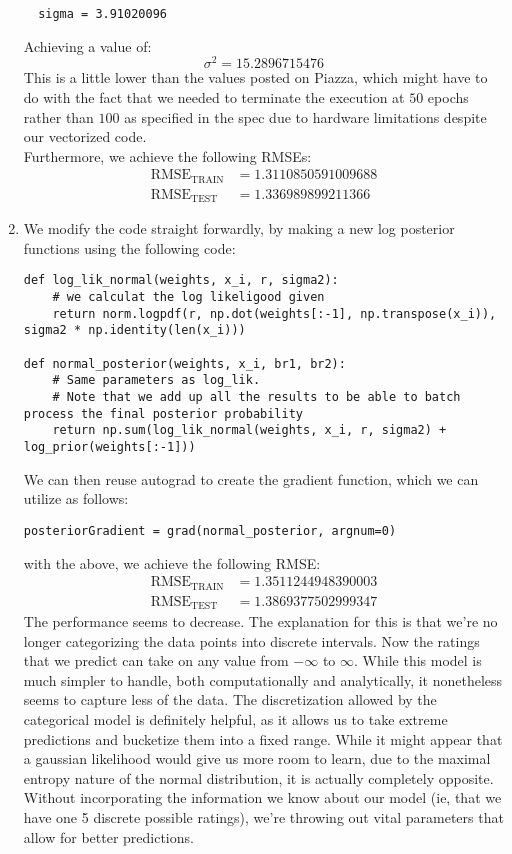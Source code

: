 \documentclass{harvardml}
\theoremstyle{plain}
\begin{document}
\begin{enumerate}
\begin{verbatim}
  sigma = 3.91020096
\end{verbatim}
Achieving a value of:
$$
\sigma^2 = 15.2896715476
$$
This is a little lower than the values posted on Piazza, which might have to do with the fact that we needed to terminate the execution at $50$ epochs rather than $100$ as specified in the spec due to hardware limitations despite our vectorized code.\\

Furthermore, we achieve the following RMSEs:
\begin{align*}
\text{RMSE}_{\text{TRAIN}} &= 1.3110850591009688 \\
\text{RMSE}_{\text{TEST}} &= 1.336989899211366
\end{align*}

\vspace{-0.1cm}
\item We modify the code straight forwardly, by making a new log posterior functions using the following code:
\begin{verbatim}
def log_lik_normal(weights, x_i, r, sigma2):
    # we calculat the log likeligood given
    return norm.logpdf(r, np.dot(weights[:-1], np.transpose(x_i)), sigma2 * np.identity(len(x_i)))

def normal_posterior(weights, x_i, br1, br2):
    # Same parameters as log_lik.
    # Note that we add up all the results to be able to batch process the final posterior probability
    return np.sum(log_lik_normal(weights, x_i, r, sigma2) + log_prior(weights[:-1]))
\end{verbatim}
We can then reuse autograd to create the gradient function, which we can utilize as follows:
\begin{verbatim}
posteriorGradient = grad(normal_posterior, argnum=0)
\end{verbatim}
with the above, we achieve the following RMSE:
\begin{align*}
\text{RMSE}_{\text{TRAIN}} &= 1.3511244948390003 \\
\text{RMSE}_{\text{TEST}} &= 1.3869377502999347
\end{align*}
The performance seems to decrease. The explanation for this is that we're no longer categorizing the data points into discrete intervals. Now the ratings that we predict can take on any value from $-\infty$ to $\infty$. While this model is much simpler to handle, both computationally and analytically, it nonetheless seems to capture less of the data. The discretization allowed by the categorical model is definitely helpful, as it allows us to take extreme predictions and bucketize them into a fixed range. While it might appear that a gaussian likelihood would give us  more room to learn, due to the maximal entropy nature of the normal distribution, it is actually completely opposite. Without incorporating the information we know about our model (ie, that we have one 5 discrete possible ratings), we're throwing out vital parameters that allow for better predictions.


\end{enumerate}
\end{document}

